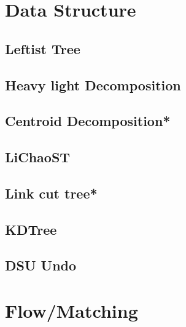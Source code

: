 \section{Data Structure}
\subsection{Leftist Tree}

\subsection{Heavy light Decomposition}

\subsection{Centroid Decomposition*} %

% 
\subsection{LiChaoST}

\subsection{Link cut tree*} %

\subsection{KDTree}

\subsection{DSU Undo}

% 


\section{Flow/Matching}
